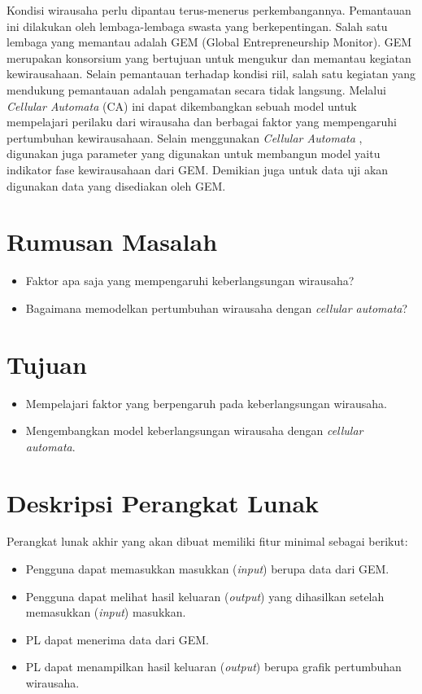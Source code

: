 \documentclass[a4paper,twoside]{article}
\begin{document}
Kondisi wirausaha perlu dipantau terus-menerus perkembangannya. Pemantauan ini dilakukan oleh lembaga-lembaga swasta yang berkepentingan. Salah satu lembaga yang memantau adalah GEM (Global Entrepreneurship Monitor). GEM merupakan konsorsium yang bertujuan untuk mengukur dan memantau kegiatan kewirausahaan. Selain pemantauan terhadap kondisi riil, salah satu kegiatan yang mendukung pemantauan adalah pengamatan secara tidak langsung. Melalui \textit{Cellular Automata} (CA) ini dapat dikembangkan sebuah model untuk mempelajari perilaku dari wirausaha dan berbagai faktor yang mempengaruhi pertumbuhan kewirausahaan. Selain menggunakan \textit{Cellular Automata} , digunakan juga parameter yang digunakan untuk membangun model yaitu indikator fase kewirausahaan dari GEM. Demikian juga untuk data uji akan digunakan data yang disediakan oleh GEM. 


\section{Rumusan Masalah}
\begin{itemize}
	\item Faktor apa saja yang mempengaruhi keberlangsungan wirausaha?
	\item Bagaimana memodelkan pertumbuhan wirausaha dengan \textit{cellular automata}?
\end{itemize}

\section{Tujuan}
\begin{itemize}
	\item Mempelajari faktor yang berpengaruh pada keberlangsungan wirausaha.
	\item Mengembangkan model keberlangsungan wirausaha dengan \textit{cellular automata}.
\end{itemize}

\section{Deskripsi Perangkat Lunak}
Perangkat lunak akhir yang akan dibuat memiliki fitur minimal sebagai berikut:
\begin{itemize}
	\item Pengguna dapat memasukkan masukkan (\textit{input}) berupa data dari GEM.
	\item Pengguna dapat melihat hasil keluaran (\textit{output}) yang dihasilkan setelah memasukkan (\textit{input}) masukkan.
  \item PL dapat menerima data dari GEM.
	\item PL dapat menampilkan hasil keluaran (\textit{output}) berupa grafik pertumbuhan wirausaha.
\end{itemize}
\end{document}
